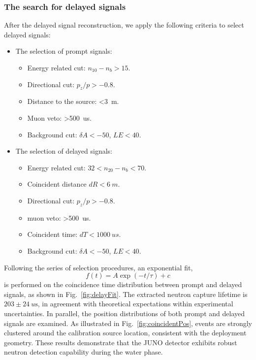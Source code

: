 \subsubsection{The search for delayed signals}
\label{sec:nhSearch}
After the delayed signal reconstruction, we apply the following criteria to select delayed signals:
\begin{itemize}
	\item {The selection of prompt signals:
	      \begin{itemize}
		      \item Energy related cut: $n_{10}-n_{b}>15$.
		      \item Directional cut: $p_z/p>-0.8$.
		      \item Distance to the source: <\SI{3}{m}.
		      \item Muon veto: >\SI{500}{us}.
		      \item Background cut: $\delta A<-50$, $LE<40$.
	      \end{itemize}}
	\item {The selection of delayed signals:
	      \begin{itemize}
		      \item Energy related cut: $32<n_{20}-n_{b}<70$.
		      \item Coincident distance $dR<\SI{6}{m}$.
		      \item Directional cut: $p_z/p>-0.8$.
		      \item muon veto: >\SI{500}{us}.
		      \item Coincident time: $dT<\SI{1000}{us}$.
		      \item Background cut: $\delta A<-50$, $LE<40$.
	      \end{itemize}}
\end{itemize}
Following the series of selection procedures, an exponential fit,
\begin{equation}
	f(t)=A\exp(-t/\tau)+c
\end{equation}
is performed on the coincidence time distribution between prompt and delayed signals, as shown in Fig.~\ref{fig:delayFit}.
The extracted neutron capture lifetime is $203 \pm \SI{24}{u\second}$, in agreement with theoretical expectations within experimental uncertainties.
In parallel, the position distributions of both prompt and delayed signals are examined. As illustrated in Fig.~\ref{fig:coincidentPos}, events are strongly clustered around the calibration source location, consistent with the deployment geometry. These results demonstrate that the JUNO detector exhibits robust neutron detection capability during the water phase.


